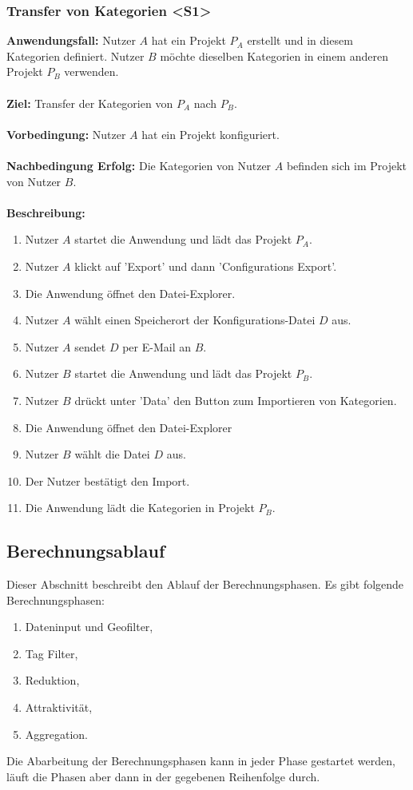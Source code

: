 \documentclass[parskip=full]{scrartcl} %
\begin{document}
\subsubsection*{Transfer von Kategorien <S1>}
\textbf{Anwendungsfall:} Nutzer $A$ hat ein Projekt $P_A$ erstellt und in diesem Kategorien definiert. Nutzer $B$ möchte dieselben Kategorien in einem anderen Projekt $P_B$ verwenden.\\\\
\textbf{Ziel:} Transfer der Kategorien von $P_A$ nach $P_B$.\\\\
\textbf{Vorbedingung:} Nutzer $A$ hat ein Projekt konfiguriert.\\\\
\textbf{Nachbedingung Erfolg:} Die Kategorien von Nutzer $A$ befinden sich im Projekt von Nutzer $B$.\\\\
\textbf{Beschreibung:}
\begin{enumerate}
    \item Nutzer $A$ startet die Anwendung und lädt das Projekt $P_A$.
    \item Nutzer $A$ klickt auf 'Export' und dann 'Configurations Export'.
    \item Die Anwendung öffnet den Datei-Explorer.
    \item Nutzer $A$ wählt einen Speicherort der Konfigurations-Datei $D$ aus.
    \item Nutzer $A$ sendet $D$ per E-Mail an $B$.
    \item Nutzer $B$ startet die Anwendung und lädt das Projekt $P_B$.
    \item Nutzer $B$ drückt unter 'Data' den Button zum Importieren von Kategorien.
    \item Die Anwendung öffnet den Datei-Explorer
    \item Nutzer $B$ wählt die Datei $D$ aus.
    \item Der Nutzer bestätigt den Import.
    \item Die Anwendung lädt die Kategorien in Projekt $P_B$.
\end{enumerate}
\newpage






\subsection{Berechnungsablauf} \hypertarget{calculations}{}
Dieser Abschnitt beschreibt den Ablauf der Berechnungsphasen. Es gibt folgende Berechnungsphasen:
\begin{enumerate}
    \item Dateninput und Geofilter,
    \item Tag Filter,
    \item Reduktion,
    \item Attraktivität,
    \item Aggregation.
\end{enumerate}
Die Abarbeitung der Berechnungsphasen kann in jeder Phase gestartet werden, läuft die Phasen aber dann in der gegebenen Reihenfolge durch.
\end{document}
